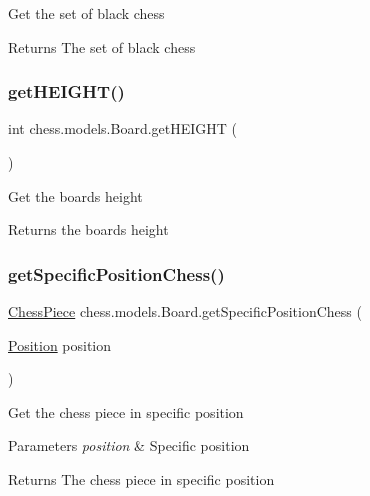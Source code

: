 Get the set of black chess

\begin{DoxyReturn}{Returns}
The set of black chess 
\end{DoxyReturn}
\mbox{\label{classchess_1_1models_1_1_board_a28a3d4b9d0738a26666b7c97394242a9}} 
\subsubsection{\texorpdfstring{get\+H\+E\+I\+G\+H\+T()}{getHEIGHT()}}
{\footnotesize\ttfamily int chess.\+models.\+Board.\+get\+H\+E\+I\+G\+HT (\begin{DoxyParamCaption}{ }\end{DoxyParamCaption})}

Get the board\textquotesingle{}s height

\begin{DoxyReturn}{Returns}
the board\textquotesingle{}s height 
\end{DoxyReturn}
\mbox{\label{classchess_1_1models_1_1_board_a3e21ecd167f3c80dfd260e9acde208c6}} 
\subsubsection{\texorpdfstring{get\+Specific\+Position\+Chess()}{getSpecificPositionChess()}}
{\footnotesize\ttfamily \mbox{\hyperlink{classchess_1_1models_1_1_chess_piece}{Chess\+Piece}} chess.\+models.\+Board.\+get\+Specific\+Position\+Chess (\begin{DoxyParamCaption}\item[{\mbox{\hyperlink{classchess_1_1models_1_1_position}{Position}}}]{position }\end{DoxyParamCaption})}

Get the chess piece in specific position


\begin{DoxyParams}{Parameters}
{\em position} & Specific position \\
\hline
\end{DoxyParams}
\begin{DoxyReturn}{Returns}
The chess piece in specific position 
\end{DoxyReturn}
\mbox{\label{classchess_1_1models_1_1_board_a0fab147b0205caf586306a03e758e7bb}} 
